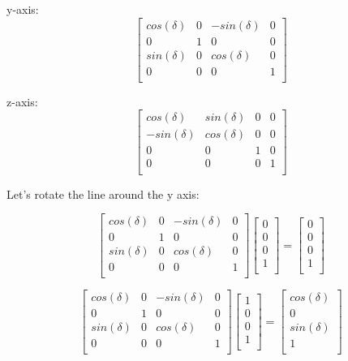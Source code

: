 \documentclass[12pt]{report} \usepackage{preamble}
\begin{document}
y-axis: \[
	\begin{bmatrix}
		cos(\delta) & 0 & -sin(\delta) & 0 \\
		0           & 1 & 0            & 0 \\
		sin(\delta) & 0 & cos(\delta)  & 0 \\
		0           & 0 & 0            & 1 \\
	\end{bmatrix}
\]

z-axis: \[
	\begin{bmatrix}
		cos(\delta)  & sin(\delta) & 0 & 0 \\
		-sin(\delta) & cos(\delta) & 0 & 0 \\
		0            & 0           & 1 & 0 \\
		0            & 0           & 0 & 1 \\
	\end{bmatrix}
\]

Let's rotate the line around the y axis:

\[
	\begin{bmatrix}
		cos(\delta) & 0 & -sin(\delta) & 0 \\
		0           & 1 & 0            & 0 \\
		sin(\delta) & 0 & cos(\delta)  & 0 \\
		0           & 0 & 0            & 1 \\
	\end{bmatrix}
	\begin{bmatrix}
		0 \\
		0 \\
		0 \\
		1 \\
	\end{bmatrix}
	=
	\begin{bmatrix}
		0 \\
		0 \\
		0 \\
		1 \\
	\end{bmatrix}
\]

\[
	\begin{bmatrix}
		cos(\delta) & 0 & -sin(\delta) & 0 \\
		0           & 1 & 0            & 0 \\
		sin(\delta) & 0 & cos(\delta)  & 0 \\
		0           & 0 & 0            & 1 \\
	\end{bmatrix}
	\begin{bmatrix}
		1 \\
		0 \\
		0 \\
		1 \\
	\end{bmatrix}
	=
	\begin{bmatrix}
		cos(\delta) \\
		0           \\
		sin(\delta) \\
		1           \\
	\end{bmatrix}
\]
\end{document}
